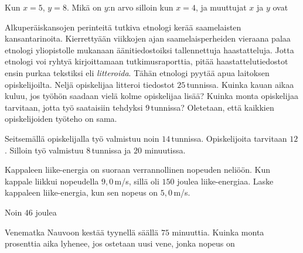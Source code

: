 \begin{tehtavasivu}
\begin{tehtava}
	Kun $x = 5$, $y = 8$. Mikä on $y$:n arvo silloin kun $x = 4$, ja muuttujat $x$ ja $y$ ovat
	\begin{vastaus}
	\end{vastaus}
\end{tehtava}

\begin{tehtava}
Alkuperäiskansojen perinteitä tutkiva etnologi kerää saamelaisten kansantarinoita. Kierrettyään viikkojen ajan saamelaisperheiden vieraana palaa etnologi yliopistolle mukanaan äänitiedostoiksi tallennettuja haastatteluja. Jotta etnologi voi ryhtyä kirjoittamaan tutkimusraporttia, pitää haastattelutiedostot ensin purkaa tekstiksi eli \emph{litteroida}. Tähän etnologi pyytää apua laitoksen opiskelijoilta. Neljä opiskelijaa litteroi tiedostot $25$\,tunnissa. Kuinka kauan aikaa kuluu, jos työhön saadaan vielä kolme opiskelijaa lisää? Kuinka monta opiskelijaa tarvitaan, jotta työ saataisiin tehdyksi $9$\,tunnissa? Oletetaan, että kaikkien opiskelijoiden työteho on sama.

\begin{vastaus}
Seitsemällä opiskelijalla työ valmistuu noin $14$\,tunnissa. Opiskelijoita tarvitaan $12$. Silloin työ valmistuu $8$\,tunnissa ja $20$ minuutissa. 
\end{vastaus}
\end{tehtava}

\begin{tehtava}
	Kappaleen liike-energia on suoraan verrannollinen nopeuden neliöön. Kun kappale liikkui nopeudella $9,0$\,m/s, sillä oli $150$ joulea liike-energiaa. Laske kappaleen liike-energia, kun sen nopeus on $5,0$\,m/s. 
	\begin{vastaus}
		Noin $46$ joulea
	\end{vastaus}
\end{tehtava}

\begin{tehtava}
	Venematka Nauvoon kestää tyynellä säällä $75$ minuuttia. Kuinka monta prosenttia aika lyhenee, jos ostetaan uusi vene, jonka nopeus on
\begin{vastaus}
\end{vastaus}
\end{tehtava}


\end{tehtavasivu}

